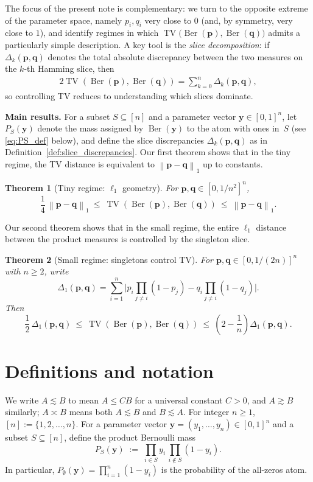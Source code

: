 \documentclass[11pt]{amsart}
\numberwithin{equation}{section}
\newtheorem{theorem}{Theorem}[section]
\theoremstyle{definition}
\newcommand{\beqn}{\begin{eqnarray}}
\newcommand{\eeqn}{\end{eqnarray}}
\newcommand{\TV}{\operatorname{TV}}
\newcommand{\Ber}{\operatorname{Ber}}
\newcommand{\defref}[1]{Definition~\ref{#1}}
\newcommand{\vct}[1]{\mathbf{#1}}
\newcommand{\pvec}{\vct{p}}
\newcommand{\qvec}{\vct{q}}
\newcommand{\yvec}{\vct{y}}
\newcommand{\normone}[1]{\left\lVert #1 \right\rVert_1}
\begin{document}
The focus of the present note is complementary: we turn to the opposite extreme of the parameter space, namely $p_i,q_i$ very close to $0$ (and, by symmetry, very close to $1$), and identify regimes in which $\TV\big(\Ber(\pvec),\Ber(\qvec)\big)$ admits a particularly simple description.
A key tool is the \emph{slice decomposition}: if $\Delta_k(\pvec,\qvec)$ denotes the total absolute discrepancy between the two measures on the $k$-th Hamming slice, then
\beqn
\label{eq:tv-delta}
2\TV(\Ber(\pvec),\Ber(\qvec))=\sum_{k=0}^n \Delta_k(\pvec,\qvec),
\eeqn
so controlling TV reduces to understanding which slices dominate.

\medskip\noindent\textbf{Main results.}
For a subset $S\subseteq[n]$ and a parameter vector $\yvec\in[0,1]^n$,
let
$P_S(\yvec)$ denote the mass assigned by $\Ber(\yvec)$ to the atom with ones in~$S$
(see \eqref{eq:PS_def} below),
and define the slice discrepancies $\Delta_k(\pvec,\qvec)$ as in \defref{def:slice_discrepancies}.
Our first theorem shows that in the tiny regime, the TV distance is equivalent to $\normone{\pvec-\qvec}$ up to constants.

\begin{theorem}[Tiny regime: $\ell_1$ geometry]\label{thm:intro_tiny_tv}
For $\pvec,\qvec\in[0,1/n^2]^n$,
\[
\frac14\,\normone{\pvec-\qvec}
\ \le\
\TV(\Ber(\pvec),\Ber(\qvec))
\ \le\
\normone{\pvec-\qvec}.
\]
\end{theorem}

Our second theorem shows that in the small regime, the entire $\ell_1$ distance between the product measures is controlled by the singleton slice.

\begin{theorem}[Small regime: singletons control TV]\label{thm:intro_small_tv}
For $\pvec,\qvec\in[0,1/(2n)]^n$
with $n\ge2$, write
\[
\Delta_1(\pvec,\qvec)
=
\sum_{i=1}^n
\Big|
p_i\prod_{j\neq i}(1-p_j)
-
q_i\prod_{j\neq i}(1-q_j)
\Big|.
\]
Then
\[
\frac12\,\Delta_1(\pvec,\qvec)
\ \le\
\TV(\Ber(\pvec),\Ber(\qvec))
\ \le\
\left(2-\frac1n\right)\Delta_1(\pvec,\qvec).
\]
\end{theorem}


\section{Definitions and notation}\label{sec:setup}
We write $A\lesssim B$ to mean $A\le C B$ for a universal constant $C>0$,
and $A\gtrsim B$ similarly; $A\asymp B$ means both $A\lesssim B$ and $B\lesssim A$.
For integer $n\ge 1$, $[n]:=\{1,2,\dots,n\}$.
For a parameter vector $\yvec=(y_1,\dots,y_n)\in[0,1]^n$ and a subset $S\subseteq[n]$, define the product Bernoulli mass
\begin{equation}\label{eq:PS_def}
P_S(\yvec)
\;:=\;
\prod_{i\in S} y_i\,\prod_{i\notin S}(1-y_i).
\end{equation}
In particular, $P_\emptyset(\yvec)=\prod_{i=1}^n(1-y_i)$ is the probability of the all-zeros atom.
\end{document}
